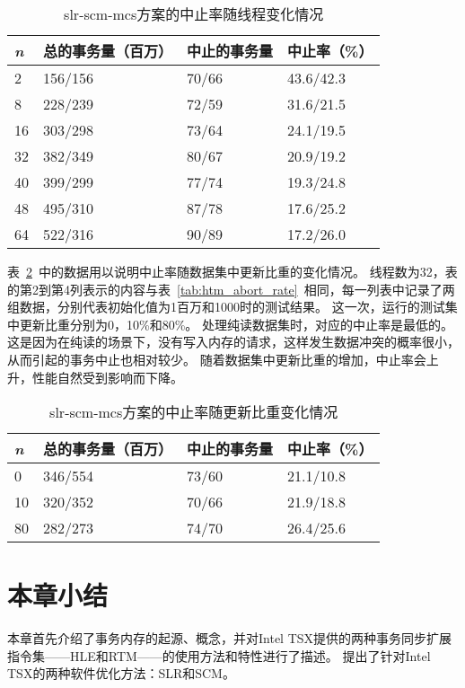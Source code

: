 \begin{table}[htbp]
  \centering
  \caption{slr-scm-mcs方案的中止率随线程变化情况}
  \label{tab:abort_rate_thread}
  \begin{tabular}{llll}
    \toprule
      \textit{n}  & 总的事务量（百万） & 中止的事务量 & 中止率（\%） \\
    \midrule
      2   & 156/156 & 70/66 & 43.6/42.3  \\
      8   & 228/239 & 72/59 & 31.6/21.5 \\
      16  & 303/298 & 73/64 & 24.1/19.5  \\
      32  & 382/349 & 80/67 & 20.9/19.2  \\
      40  & 399/299 & 77/74 & 19.3/24.8 \\
      48  & 495/310 & 87/78 & 17.6/25.2  \\
      64  & 522/316 & 90/89 & 17.2/26.0 \\
    \bottomrule
  \end{tabular}
\end{table}

表~\ref{tab:htm_update}~中的数据用以说明中止率随数据集中更新比重的变化情况。
线程数为32，表的第2到第4列表示的内容与表~\ref{tab:htm_abort_rate}~相同，每一列表中记录了两组数据，分别代表初始化值为1百万和1000时的测试结果。
这一次，运行的测试集中更新比重分别为0，10\%和80\%。
处理纯读数据集时，对应的中止率是最低的。
这是因为在纯读的场景下，没有写入内存的请求，这样发生数据冲突的概率很小，从而引起的事务中止也相对较少。
随着数据集中更新比重的增加，中止率会上升，性能自然受到影响而下降。

\begin{table}[htbp]
  \centering
  \caption{slr-scm-mcs方案的中止率随更新比重变化情况}
  \label{tab:htm_update}
  \begin{tabular}{llll}
    \toprule
      \textit{n}  & 总的事务量（百万） & 中止的事务量 & 中止率（\%） \\
    \midrule
      0   &  346/554 & 73/60 & 21.1/10.8  \\
      10  &  320/352 & 70/66 & 21.9/18.8 \\
      80  &  282/273 & 74/70 & 26.4/25.6  \\
    \bottomrule
  \end{tabular}
\end{table}

\section{本章小结}
本章首先介绍了事务内存的起源、概念，并对Intel TSX提供的两种事务同步扩展指令集——HLE和RTM——的使用方法和特性进行了描述。
提出了针对Intel TSX的两种软件优化方法：SLR和SCM。

